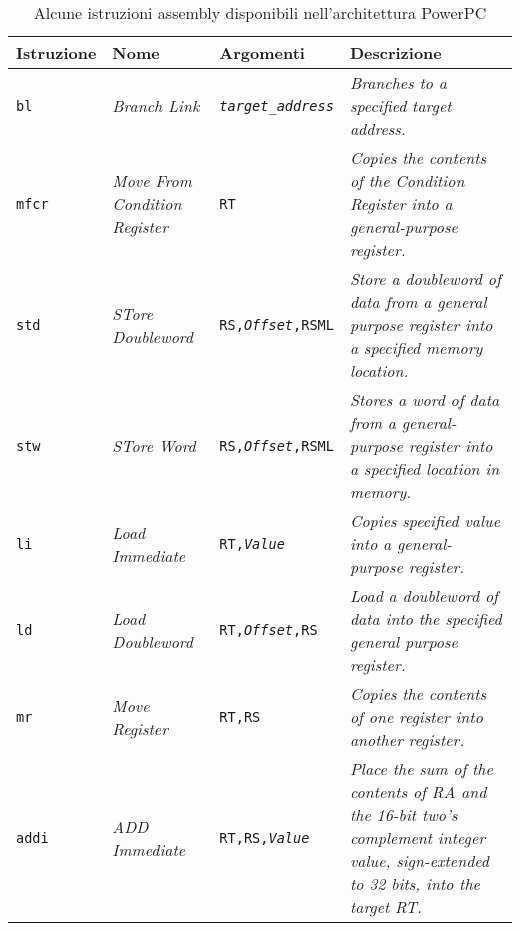 \documentclass[10pt,a4paper, titlepage]{report}
\begin{document}
	\begin{table}[h!]
	  \begin{center}
	    \caption{Alcune istruzioni assembly disponibili nell'architettura PowerPC\texttrademark}
	    \centering
	    
	    \label{tab:AssemblyIstrucions}
	    \begin{adjustbox}{center=\textwidth}
	    \begin{tabular}{l|l|l|p{6cm}}
	      \toprule
	      Istruzione & Nome & Argomenti & Descrizione \\
	   		\midrule
	   		\texttt{bl} & \textit{Branch Link} & \texttt{\textit{target\_address}} & \textit{Branches to a specified target address.} \\
	   	
   	       \texttt{mfcr} & \textit{Move From Condition Register} & \texttt{RT} & \textit{Copies the contents of the Condition Register into a general-purpose register.} \\
 
	       \texttt{std} & \textit{STore Doubleword} & \texttt{RS,\textit{Offset},RSML} & \textit{Store a doubleword of data from a general purpose register into a specified memory location.}\\
	       
	       \texttt{stw} & \textit{STore Word} & \texttt{RS,\textit{Offset},RSML} & \textit{Stores a word of data from a general-purpose register into a specified location in memory.} \\
	       
	       \texttt{li} & \textit{Load Immediate} & \texttt{RT,\textit{Value}} & \textit{Copies specified value into a general-purpose register.} \\
	       
	       \texttt{ld} & \textit{Load Doubleword} & \texttt{RT,\textit{Offset},RS} & \textit{Load a doubleword of data into the specified general purpose register.} \\
	       
	       \texttt{mr} & \textit{Move Register} & \texttt{RT,RS} & \textit{Copies the contents of one register into another register.} \\
	       
	       \texttt{addi} & \textit{ADD Immediate} & \texttt{RT,RS,\textit{Value}} & \textit{Place the sum of the contents of RA and the 16-bit two's complement integer value, sign-extended to 32 bits, into the target RT.} \\
	       	

\end{tabular}
\end{adjustbox}
\end{center}
\end{table}
\end{document}
